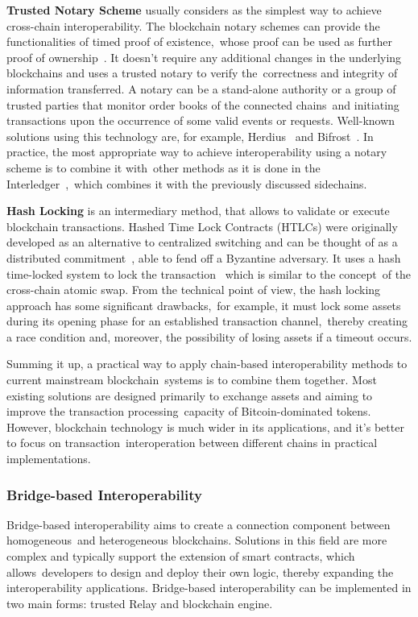 \textbf{Trusted Notary Scheme} usually considers as the simplest way to achieve cross-chain interoperability.
The blockchain notary schemes can provide the functionalities of timed proof of existence,\
whose proof can be used as further proof of ownership~\cite{DIFRANCESCOMAESA202099}.
It doesn't require any additional changes in the underlying blockchains and uses a trusted notary to verify the\
correctness and integrity of information transferred.
A notary can be a stand-alone authority or a group of trusted parties that monitor order books of the connected chains\
and initiating transactions upon the occurrence of some valid events or requests.
Well-known solutions using this technology are, for example, Herdius~\cite{Balazs2017} and Bifrost~\cite{Scheid2019}.
In practice, the most appropriate way to achieve interoperability using a notary scheme is to combine it with\
other methods as it is done in the Interledger~\cite{Thomas2015},\
which combines it with the previously discussed sidechains.

\textbf{Hash Locking} is an intermediary method, that allows to validate or execute blockchain transactions.
Hashed Time Lock Contracts (HTLCs) were originally developed as an alternative to centralized switching
and can be thought of as a distributed commitment~\cite{Kumar2021}, able to fend off a Byzantine adversary.
It uses a hash time-locked system to lock the transaction~\cite{Pillai2019} which is similar to the concept\
of the cross-chain atomic swap.
From the technical point of view, the hash locking approach has some significant drawbacks,\
for example, it must lock some assets during its opening phase for an established transaction channel,\
thereby creating a race condition and, moreover, the possibility of losing assets if a timeout occurs.

Summing it up, a practical way to apply chain-based interoperability methods to current mainstream blockchain\
systems is to combine them together.
Most existing solutions are designed primarily to exchange assets and aiming to improve the transaction processing\
capacity of Bitcoin-dominated tokens.
However, blockchain technology is much wider in its applications, and it's better to focus on transaction\
interoperation between different chains in practical implementations.

\subsubsection{Bridge-based Interoperability}
Bridge-based interoperability aims to create a connection component between homogeneous\
and heterogeneous blockchains.
Solutions in this field are more complex and typically support the extension of smart contracts, which allows\
developers to design and deploy their own logic, thereby expanding the interoperability applications.
Bridge-based interoperability can be implemented in two main forms: trusted Relay and blockchain engine.

